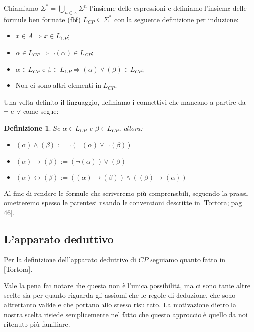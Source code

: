 \documentclass[a4paper, titlepage, 12pt]{report}
\newtheorem{definition}{Definizione}
\begin{document}
Chiamiamo $\Sigma^{*} = \bigcup_{n \in A} \Sigma^n$ l'insieme delle espressioni
e definiamo l'insieme delle formule ben formate (fbf) $L_{CP} \subseteq \Sigma^{*}$ con la seguente definizione
per induzione:
\begin{itemize}
\item $x \in A \Rightarrow x \in L_{CP}$;
\item $\alpha \in L_{CP} \Rightarrow \neg (\alpha) \in L_{CP}$;
\item $\alpha \in L_{CP}$ e $\beta \in L_{CP} \Rightarrow (\alpha) \lor (\beta) \in L_{CP}$;
\item Non ci sono altri elementi in $L_{CP}$.
\end{itemize}

Una volta definito il linguaggio, definiamo i connettivi che mancano a partire da $\neg$ e $\lor$
come segue:
\begin{definition}
Se $\alpha \in L_{CP}$ e $\beta \in L_{CP}$, allora:
\begin{itemize}
\item $(\alpha) \land (\beta) := \neg(\neg(\alpha) \lor \neg(\beta))$
\item $(\alpha) \rightarrow (\beta) := (\neg(\alpha)) \lor (\beta)$
\item $(\alpha) \leftrightarrow (\beta) := ((\alpha) \rightarrow (\beta)) \land ((\beta) \rightarrow (\alpha))$
\end{itemize}
\end{definition}

Al fine di rendere le formule che scriveremo più comprensibili, seguendo la prassi,
ometteremo spesso le parentesi usando le convenzioni descritte in [Tortora; pag 46].

\subsection{L'apparato deduttivo}
Per la definizione dell'apparato deduttivo di $CP$ seguiamo quanto fatto in [Tortora].

Vale la pena far notare che questa non è l'unica possibilità, ma ci sono tante altre scelte sia
per quanto riguarda gli assiomi che le regole di deduzione, che sono altrettanto valide
e che portano allo stesso risultato. La motivazione dietro la nostra scelta
risiede semplicemente nel fatto che questo approccio è quello da noi ritenuto più familiare.
\end{document}
